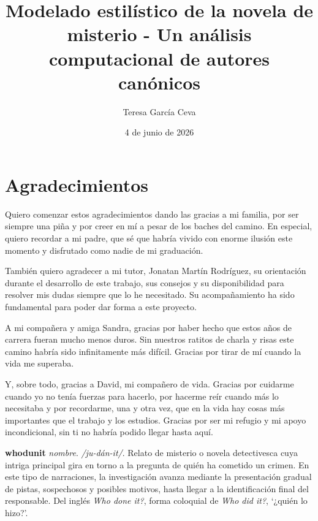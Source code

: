 \documentclass[IB]{TFUOC}%
\title{Modelado estilístico de la novela de misterio - Un análisis computacional de autores canónicos}
\author{Teresa García Ceva}
\date{4 de junio de 2026}
\begin{document}
\estructura

\tableofcontents

\listoffigures

\listoftables

\chapter*{Agradecimientos}

Quiero comenzar estos agradecimientos dando las gracias a mi familia, por ser siempre una piña y por creer en mí a pesar de los baches del camino. En especial, quiero recordar a mi padre, que sé que habría vivido con enorme ilusión este momento y disfrutado como nadie de mi graduación.

También quiero agradecer a mi tutor, Jonatan Martín Rodríguez, su orientación durante el desarrollo de este trabajo, sus consejos y su disponibilidad para resolver mis dudas siempre que lo he necesitado. Su acompañamiento ha sido fundamental para poder dar forma a este proyecto.

A mi compañera y amiga Sandra, gracias por haber hecho que estos años de carrera fueran mucho menos duros. Sin nuestros ratitos de charla y risas este camino habría sido infinitamente más difícil. Gracias por tirar de mí cuando la vida me superaba.

Y, sobre todo, gracias a David, mi compañero de vida. Gracias por cuidarme cuando yo no tenía fuerzas para hacerlo, por hacerme reír cuando más lo necesitaba y por recordarme, una y otra vez, que en la vida hay cosas más importantes que el trabajo y los estudios. Gracias por ser mi refugio y mi apoyo incondicional, sin ti no habría podido llegar hasta aquí.

\cleardoublepage

\vspace*{0.15\textheight}

\noindent\hfill
\begin{minipage}{0.75\textwidth}
{\Large\bfseries whodunit} \textit{nombre}. \textit{/ju-dán-it/}. Relato de misterio o novela detectivesca cuya intriga principal gira en torno a la pregunta de quién ha cometido un crimen. En este tipo de narraciones, la investigación avanza mediante la presentación gradual de pistas, sospechosos y posibles motivos, hasta llegar a la identificación final del responsable. Del inglés \textit{Who done it?}, forma coloquial de \textit{Who did it?}, `¿quién lo hizo?'.
\end{minipage}
\end{document}
